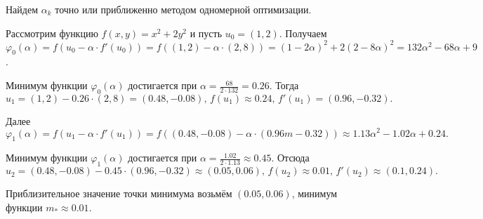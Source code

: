 Найдем $\alpha_k$ точно или приближенно методом одномерной оптимизации. 

\begin{example}
	Рассмотрим функцию $f(x, y) = x^2 + 2 y^2$ и пусть $u_0 = (1, 2)$. Получаем $\varphi_0(\alpha) = f(u_0 - \alpha \cdot f'(u_0)) = f((1, 2) - \alpha \cdot (2, 8)) = (1 - 2 \alpha)^2 + 2(2 - 8 \alpha)^2 = 132 \alpha^2 - 68 \alpha + 9$.
	
	Минимум функции $\varphi_0(\alpha)$ достигается при $\alpha = \frac{68}{2 \cdot 132} = 0.26$. Тогда 
	\begin{equation*}
		u_1 = (1, 2) - 0.26 \cdot (2, 8) = (0.48, - 0.08), \, f(u_1) \approx 0.24, \, f'(u_1) = (0.96, -0.32).
	\end{equation*}
	
	Далее
	\begin{equation*}
		\varphi_1(\alpha) = f(u_1 - \alpha \cdot f'(u_1)) = f((0.48, -0.08) - \alpha \cdot (0.96m -0.32)) \approx 1.13 \alpha^2 - 1.02 \alpha + 0.24.
	\end{equation*} 
	
	Минимум функции $\varphi_1(\alpha)$ достигается при $\alpha = \frac{1.02}{2 \cdot 1.13} \approx 0.45$. Отсюда 
	\begin{equation*}
		u_2 = (0.48, -0.08) - 0.45 \cdot (0.96, -0.32) \approx (0.05, 0.06), \, f(u_2) \approx 0.01, \, f'(u_2) \approx (0.1, 0.24).
	\end{equation*}
	
	Приблизительное значение точки минимума возьмём $(0.05, 0.06)$, минимум функции $m_{\ast} \approx 0.01$.
\end{example}